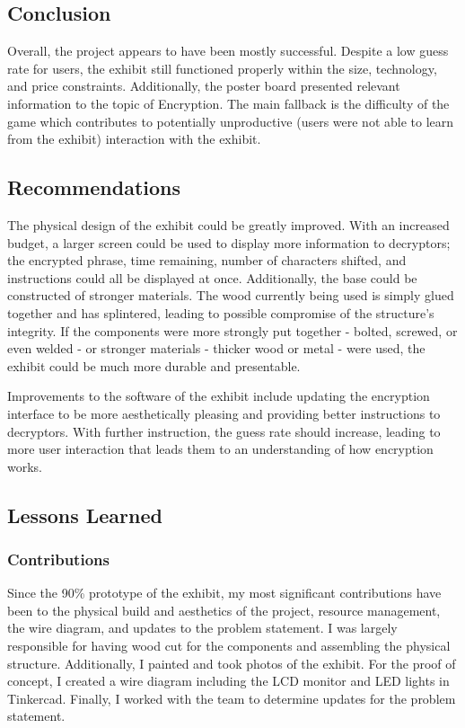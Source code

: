 \documentclass[conference]{IEEEtran}
\begin{document}
\subsection{Conclusion}

\par Overall, the project appears to have been mostly successful.  Despite a low guess rate for users, the exhibit still functioned properly within the size, technology, and price constraints.  Additionally, the poster board presented relevant information to the topic of Encryption.  The main fallback is the difficulty of the game which contributes to potentially unproductive (users were not able to learn from the exhibit) interaction with the exhibit.

\subsection{Recommendations}


\par The physical design of the exhibit could be greatly improved.  With an increased budget, a larger screen could be used to display more information to decryptors; the encrypted phrase, time remaining, number of characters shifted, and instructions could all be displayed at once.  Additionally, the base could be constructed of stronger materials.  The wood currently being used is simply glued together and has splintered, leading to possible compromise of the structure’s integrity.  If the components were more strongly put together - bolted, screwed, or even welded - or stronger materials - thicker wood or metal - were used, the exhibit could be much more durable and presentable.  
\par Improvements to the software of the exhibit include updating the encryption interface to be more aesthetically pleasing and providing better instructions to decryptors.  With further instruction, the guess rate should increase, leading to more user interaction that leads them to an understanding of how encryption works.

\subsection{Lessons Learned}

\subsubsection{Contributions}

\par Since the 90\% prototype of the exhibit, my most significant contributions have been to the physical build and aesthetics of the project, resource management, the wire diagram, and updates to the problem statement.  I was largely responsible for having wood cut for the components and assembling the physical structure.  Additionally, I painted and took photos of the exhibit.  For the proof of concept, I created a wire diagram including the LCD monitor and LED lights in Tinkercad.  Finally, I worked with the team to determine updates for the problem statement.
\end{document}
